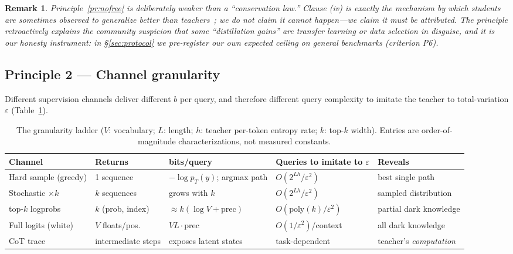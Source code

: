\documentclass[11pt]{article}
\newtheorem{remark}{Remark}
\begin{document}
\begin{remark}
Principle~\ref{pr:nofree} is deliberately weaker than a ``conservation law.'' Clause (iv) is exactly the mechanism by which students are sometimes observed to generalize better than teachers~\cite{zhang2025bias}; we do not claim it cannot happen---we claim it must be \emph{attributed}. The principle retroactively explains the community suspicion that some ``distillation gains'' are transfer learning or data selection in disguise, and it is our honesty instrument: in \S\ref{sec:protocol} we \emph{pre-register our own expected ceiling} on general benchmarks (criterion P6).
\end{remark}

\subsection{Principle 2 --- Channel granularity}
\label{sec:granularity}
Different supervision channels deliver different $b$ per query, and therefore different query complexity to imitate the teacher to total-variation $\varepsilon$ (Table~\ref{tab:ladder}).

\begin{table}[t]
\centering
\caption{The granularity ladder ($V$: vocabulary; $L$: length; $h$: teacher per-token entropy rate; $k$: top-$k$ width). Entries are order-of-magnitude characterizations, not measured constants.}
\label{tab:ladder}
\small
\begin{adjustbox}{max width=\linewidth}
\begin{tabular}{@{}lllll@{}}
\toprule
\textbf{Channel} & \textbf{Returns} & \textbf{bits/query} & \textbf{Queries to imitate to $\varepsilon$} & \textbf{Reveals} \\
\midrule
Hard sample (greedy) & 1 sequence & $-\log p_T(y)$; argmax path & $O(2^{Lh}/\varepsilon^2)$ & best single path \\
Stochastic $\times k$ & $k$ sequences & grows with $k$ & $O(2^{Lh}/\varepsilon^2)$ & sampled distribution \\
top-$k$ logprobs & $k$ (prob, index) & $\approx k(\log V{+}\text{prec})$ & $O(\mathrm{poly}(k)/\varepsilon^2)$ & partial dark knowledge \\
Full logits (white) & $V$ floats/pos. & $VL\cdot\text{prec}$ & $O(1/\varepsilon^2)$/context & all dark knowledge \\
CoT trace & intermediate steps & exposes latent states & task-dependent & teacher's \emph{computation} \\
\bottomrule
\end{tabular}
\end{adjustbox}
\end{table}
\end{document}

